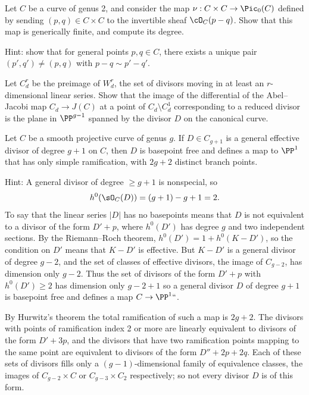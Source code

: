 \begin{exercise}
Let $C$ be a curve of genus 2, and consider the map $\nu : C \times C
\to \Pic_0(C)$ defined by sending $(p, q)\in C \times C$ to the
invertible sheaf $\cO_C(p-q)$. Show that this map is 
generically finite,
%
and compute its degree.

Hint: show that for general points $p, q \in C$, there exists a unique pair $(p',q') \neq (p,q)$ with $p - q \sim p'-q'$.
\end{exercise}

\begin{exercise} \label{comparison with geometric RR}
Let $C^{r}_{d}$ be the preimage of $W^{r}_{d}$, the set of divisors moving in at least an $r$-dimensional linear series.
Show that the image of the 
differential of the Abel--Jacobi map
%
$C_{d}
\to J(C)$ at a point of $C_{d} \setminus C^1_d$  corresponding to a
reduced divisor
%
 is  the plane in $\PP^{g-1}$ spanned by the divisor
$D$ on the canonical curve.
\end{exercise}

\begin{exercise}[$g+1$ theorem]\label{g+1 theorem} 
Let $C$ be a smooth projective curve of genus $g$. 
%
If $D \in C_{g+1}$ is a 
general effective divisor
%
of degree $g+1$ on $C$, then 
$D$ is basepoint free and defines a  map to $\PP^1$ that has only
simple ramification, with $2g+2$ distinct  
branch points.
%

Hint: 
A general divisor of degree $\geq g+1$ is nonspecial, so 
$$h^0(\sO_C(D)) = (g+1)-g+1 = 2.$$ 
To say that the linear series $|D|$ has no basepoints means that $D$ is not equivalent to a divisor of the form
$D'+p$, where $h^0(D')$ has degree $g$ and two independent sections.
By the 
Riemann--Roch theorem,
%
$h^0(D') = 1+h^0(K-D')$, 
so the condition on $D'$ means that $K-D'$ is effective. 
But $K-D'$ is a general divisor of degree $g-2$, and
the set of classes of effective divisors, the image of $C_{g-2}$, has dimension only $g-2$. 
Thus the set of divisors of the form $D'+p$ with $h^0(D') \geq 2$ has dimension only $g -2 +1$
so a general divisor $D$ of degree $g+1$ is basepoint free and defines a map $C\to \PP^1` `$. 

By 
Hurwitz's theorem
%
the total ramification of such a map is $2g+2$. The divisors with points of ramification
index 2 or more are linearly equivalent to divisors of the form $D'+3p$, and the divisors that have two ramification
points mapping to the same point are equivalent to divisors of the form $D''+2p+2q$. Each of these sets
of divisors fills only a 
$(g{-}1)$-dimensional family of equivalence classes, the images of 
$C_{g-2}\times C$ or $C_{g-3}\times C_2$ respectively; so not every divisor $D$ is of this form.
\end{exercise}


